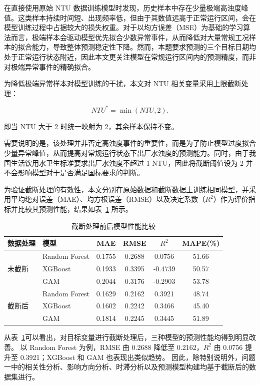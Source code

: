\documentclass[UTF8,zihao=-4]{ctexart}
\begin{document}
在直接使用原始 NTU 数据训练模型时发现，历史样本中存在少量极端高浊度峰值。这类样本持续时间短、出现频率低，但由于其数值远高于正常运行区间，会在模型训练过程中占据较大的损失权重。对于以均方误差（MSE）为基础的学习算法而言，极端样本会驱动模型优先拟合少数异常事件，从而降低对大量常规工况样本的拟合能力，导致整体预测稳定性下降。然而，本题要求预测的三个目标日期均处于正常运行状态附近，因此本文更关注模型在常规运行区间内的预测精度，而非对极端异常事件的精确拟合。

为降低极端异常样本对模型训练的干扰，本文对 NTU 相关变量采用上限截断处理：

\[
NTU^{*}=\min(NTU,2).
\]

即当 NTU 大于 2 时统一映射为 2，其余样本保持不变。

需要说明的是，该处理并非否定高浊度事件的重要性，而是为了防止模型过度拟合少量异常峰值，从而提高对常规运行状态下出厂水浊度的预测能力。同时，由于我国生活饮用水卫生标准要求出厂水浊度不超过 1 NTU，因此将截断阈值设为 2 并不会影响模型对于是否满足国标要求的判断。

为验证截断处理的有效性，本文分别在原始数据和截断数据上训练相同模型，并采用平均绝对误差（MAE）、均方根误差（RMSE）以及决定系数（$R^2$）作为评价指标并比较其预测性能，结果如表~\ref{tab:clip_model_compare} 所示。

\begin{table}[H]
\centering
\caption{截断处理前后模型性能比较}
\label{tab:clip_model_compare}
\begin{tabular}{llcccc}
\toprule
数据处理 & 模型 & MAE & RMSE & $R^2$ & MAPE(\%) \\
\midrule
\multirow{3}{*}{未截断}
& Random Forest & 0.1755 & 0.2688 & 0.0756 & 51.66 \\
& XGBoost       & 0.1933 & 0.3395 & -0.4739 & 50.57 \\
& GAM           & 0.2044 & 0.3176 & -0.2903 & 53.78 \\
\midrule
\multirow{3}{*}{截断后}
& Random Forest & 0.1629 & 0.2162 & 0.3921 & 48.74 \\
& XGBoost       & 0.1602 & 0.2242 & 0.3466 & 45.40 \\
& GAM           & 0.1814 & 0.2245 & 0.3445 & 51.89 \\
\bottomrule
\end{tabular}
\end{table}

从表~\ref{tab:clip_model_compare}可以看出，对目标变量进行截断处理后，三种模型的预测性能均得到明显改善。
以 Random Forest 为例，RMSE 由 0.2688 降低至 0.2162，$R^2$ 由 0.0756 提升至 0.3921；XGBoost 和 GAM 也表现出类似趋势。
因此，除特别说明外，问题一中的相关性分析、影响方向分析、时滞分析以及预测模型构建均基于截断后的数据集进行。
\end{document}
